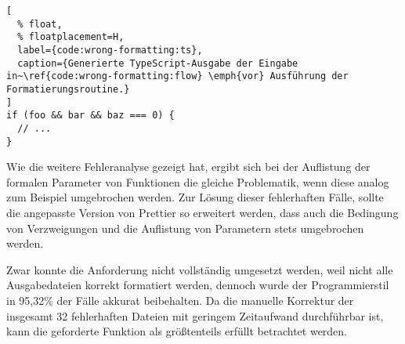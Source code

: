 \begin{lstlisting}[
  % float,
  % floatplacement=H,
  label={code:wrong-formatting:ts},
  caption={Generierte TypeScript-Ausgabe der Eingabe in~\ref{code:wrong-formatting:flow} \emph{vor} Ausführung der Formatierungsroutine.}
]
if (foo && bar && baz === 0) {
  // ...
}
\end{lstlisting}

Wie die weitere Fehleranalyse gezeigt hat, ergibt sich bei der Auflistung der formalen Parameter von Funktionen die gleiche Problematik, wenn diese analog zum Beispiel umgebrochen werden. Zur Lösung dieser fehlerhaften Fälle, sollte die angepasste Version von Prettier so erweitert werden, dass auch die Bedingung von Verzweigungen und die Auflistung von Parametern stets umgebrochen werden.

Zwar konnte die Anforderung nicht vollständig umgesetzt werden, weil nicht alle Ausgabedateien korrekt formatiert werden, dennoch wurde der Programmierstil in 95,32\% der Fälle akkurat beibehalten. Da die manuelle Korrektur der insgesamt 32 fehlerhaften Dateien mit geringem Zeitaufwand durchführbar ist, kann die geforderte Funktion als größtenteils erfüllt betrachtet werden.
